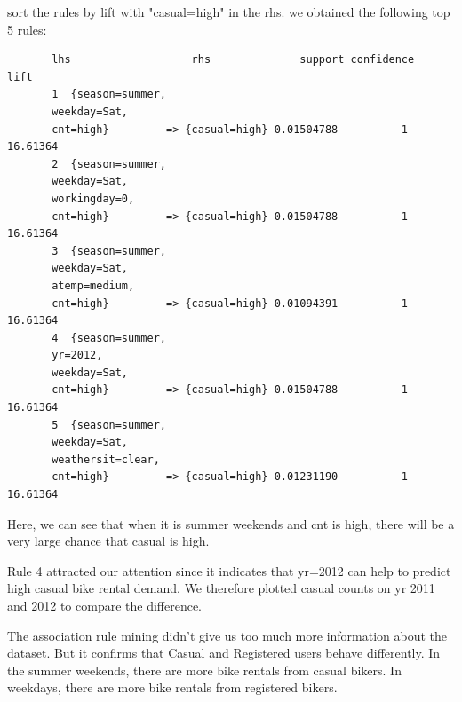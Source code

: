 \documentclass[12pt]{article}
\begin{document}
	 sort the rules by lift with "casual=high" in the rhs. we obtained the following top 5 rules: \color{blue}
	\begin{verbatim}
	   lhs                   rhs              support confidence     lift
	   1  {season=summer,                                                   
	   weekday=Sat,                                                     
	   cnt=high}         => {casual=high} 0.01504788          1 16.61364
	   2  {season=summer,                                                   
	   weekday=Sat,                                                     
	   workingday=0,                                                    
	   cnt=high}         => {casual=high} 0.01504788          1 16.61364
	   3  {season=summer,                                                   
	   weekday=Sat,                                                     
	   atemp=medium,                                                    
	   cnt=high}         => {casual=high} 0.01094391          1 16.61364
	   4  {season=summer,                                                   
	   yr=2012,                                                         
	   weekday=Sat,                                                     
	   cnt=high}         => {casual=high} 0.01504788          1 16.61364
	   5  {season=summer,                                                   
	   weekday=Sat,                                                     
	   weathersit=clear,                                                
	   cnt=high}         => {casual=high} 0.01231190          1 16.61364
	\end{verbatim}\color{black}
	Here, we can see that when it is summer weekends and cnt is high, there will be a very large chance that casual is high.  
	
	Rule 4 attracted our attention since it indicates that yr=2012 can help to predict high casual bike rental demand. We therefore plotted casual counts on yr 2011 and 2012 to compare the difference. 
	
	The association rule mining didn't give us too much more information about the dataset. But it confirms that Casual and Registered users behave differently. In the summer weekends, there are more bike rentals from casual bikers. In weekdays, there are more bike rentals from registered bikers. 
	
\end{document}
